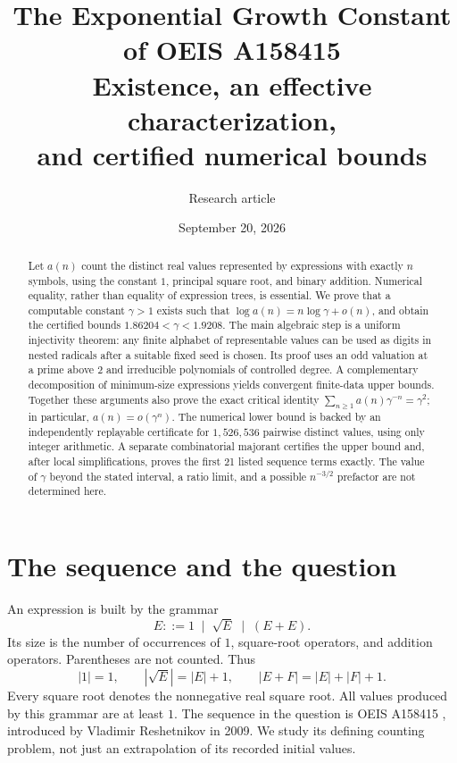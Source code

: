 \documentclass[11pt,letterpaper]{article}
\title{\textbf{The Exponential Growth Constant\\of OEIS A158415}\\[0.7em]
\large Existence, an effective characterization,\\and certified numerical bounds}
\author{Research article}
\date{September 20, 2026}
\numberwithin{equation}{section}
\theoremstyle{definition}
\begin{document}
\maketitle
\begin{abstract}
Let $a(n)$ count the distinct real values represented by expressions with exactly
$n$ symbols, using the constant $1$, principal square root, and binary addition.
Numerical equality, rather than equality of expression trees, is essential.
We prove that a computable constant $\gamma>1$ exists such that
$\log a(n)=n\log\gamma+o(n)$, and obtain the certified bounds
$1.86204<\gamma<1.9208$.
The main algebraic step is a uniform injectivity theorem: any finite alphabet
of representable values can be used as digits in nested radicals after a
suitable fixed seed is chosen. Its proof uses an odd valuation at a prime
above $2$ and irreducible polynomials of controlled degree.
A complementary decomposition of minimum-size expressions yields convergent
finite-data upper bounds. Together these arguments also prove the exact
critical identity $\sum_{n\ge1}a(n)\gamma^{-n}=\gamma^2$; in particular,
$a(n)=o(\gamma^n)$.
The numerical lower bound is backed by an independently replayable certificate
for $1{,}526{,}536$ pairwise distinct values, using only integer arithmetic.
A separate combinatorial majorant certifies the upper bound and, after local
simplifications, proves the first 21 listed sequence terms exactly.
The value of $\gamma$ beyond the stated interval, a ratio limit, and a possible
$n^{-3/2}$ prefactor are not determined here.
\end{abstract}

\clearpage
{\small\setlength{\parskip}{0pt}
\tableofcontents}
\clearpage

\section{The sequence and the question}

An expression is built by the grammar
\[
 E ::= 1 \;\mid\; \sqrt E \;\mid\; (E+E).
\]
Its size is the number of occurrences of $1$, square-root operators, and
addition operators. Parentheses are not counted. Thus
\[
 |1|=1,\qquad |\sqrt E|=|E|+1,\qquad |E+F|=|E|+|F|+1.
\]
Every square root denotes the nonnegative real square root. All values produced
by this grammar are at least $1$.
The sequence in the question is OEIS A158415 \cite{oeis}, introduced by
Vladimir Reshetnikov in 2009. We study its defining counting problem, not just
an extrapolation of its recorded initial values.
\end{document}
